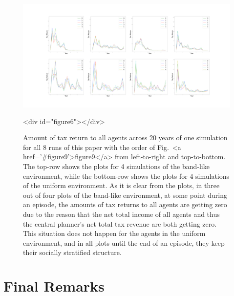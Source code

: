 \documentclass{article}
\begin{document}
\begin{figure}
\centering
\includegraphics[width=0.7\linewidth]{"A_Multi-agent_Reinforcement_Learning_Study_of_Emergence_of_Social_Classes_out_of_Arbitrary_Governance_The_Role_of_Environment_Plots/Tax_Return_across_Consequtive_Years_of_an_Episode_for_all_Agents_of_Two_Scenarios"}
\caption{Amount of tax return to all agents across 20 years of one simulation for all 8 runs of this paper with the order of Fig.~<a href='#figure9'>figure9</a> from left-to-right and top-to-bottom. The top-row shows the plots for 4 simulations of the band-like environment, while the bottom-row shows the plots for 4 simulations of the uniform environment. As it is clear from the plots, in three out of four plots of the band-like environment, at some point during an episode, the amounts of tax returns to all agents are getting zero due to the reason that the net total income of all agents and thus the central planner's net total tax revenue are both getting zero. This situation does not happen for the agents in the uniform environment, and in all plots until the end of an episode, they keep their socially stratified structure.}
<div id="figure6"></div>

\end{figure}

\section{Final Remarks}
\end{document}
